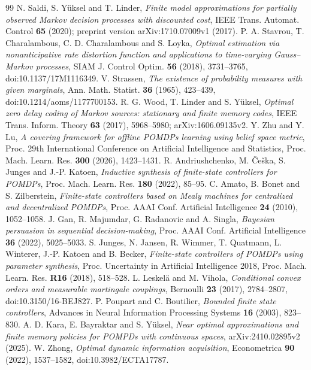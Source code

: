 \begin{thebibliography}{99}
 N. Saldi, S. Y\"uksel and T. Linder, \emph{Finite model approximations for partially observed Markov decision processes with discounted cost}, IEEE Trans. Automat. Control \textbf{65} (2020); preprint version arXiv:1710.07009v1 (2017).
 P. A. Stavrou, T. Charalambous, C. D. Charalambous and S. Loyka, \emph{Optimal estimation via nonanticipative rate distortion function and applications to time-varying Gauss--Markov processes}, SIAM J. Control Optim. \textbf{56} (2018), 3731--3765, doi:10.1137/17M1116349.
 V. Strassen, \emph{The existence of probability measures with given marginals}, Ann. Math. Statist. \textbf{36} (1965), 423--439, doi:10.1214/aoms/1177700153.
 R. G. Wood, T. Linder and S. Y\"uksel, \emph{Optimal zero delay coding of Markov sources: stationary and finite memory codes}, IEEE Trans. Inform. Theory \textbf{63} (2017), 5968--5980; arXiv:1606.09135v2.
 Y. Zhu and Y. Lu, \emph{A covering framework for offline POMDPs learning using belief space metric}, Proc. 29th International Conference on Artificial Intelligence and Statistics, Proc. Mach. Learn. Res. \textbf{300} (2026), 1423--1431.
 R. Andriushchenko, M. \v{C}e\v{s}ka, S. Junges and J.-P. Katoen, \emph{Inductive synthesis of finite-state controllers for POMDPs}, Proc. Mach. Learn. Res. \textbf{180} (2022), 85--95.
 C. Amato, B. Bonet and S. Zilberstein, \emph{Finite-state controllers based on Mealy machines for centralized and decentralized POMDPs}, Proc. AAAI Conf. Artificial Intelligence \textbf{24} (2010), 1052--1058.
 J. Gan, R. Majumdar, G. Radanovic and A. Singla, \emph{Bayesian persuasion in sequential decision-making}, Proc. AAAI Conf. Artificial Intelligence \textbf{36} (2022), 5025--5033.
 S. Junges, N. Jansen, R. Wimmer, T. Quatmann, L. Winterer, J.-P. Katoen and B. Becker, \emph{Finite-state controllers of POMDPs using parameter synthesis}, Proc. Uncertainty in Artificial Intelligence 2018, Proc. Mach. Learn. Res. \textbf{R16} (2018), 518--528.
 L. Leskel\"a and M. Vihola, \emph{Conditional convex orders and measurable martingale couplings}, Bernoulli \textbf{23} (2017), 2784--2807, doi:10.3150/16-BEJ827.
 P. Poupart and C. Boutilier, \emph{Bounded finite state controllers}, Advances in Neural Information Processing Systems \textbf{16} (2003), 823--830.
 A. D. Kara, E. Bayraktar and S. Y\"uksel, \emph{Near optimal approximations and finite memory policies for POMPDs with continuous spaces}, arXiv:2410.02895v2 (2025).
 W. Zhong, \emph{Optimal dynamic information acquisition}, Econometrica \textbf{90} (2022), 1537--1582, doi:10.3982/ECTA17787.
\end{thebibliography}
